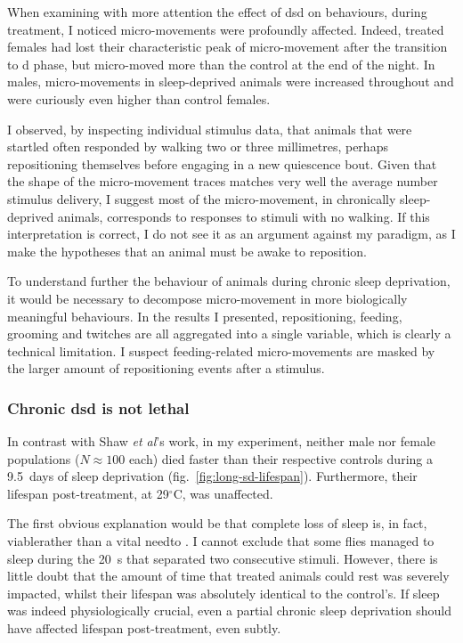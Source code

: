 When examining with more attention the effect of \gls{dsd} on behaviours, during treatment,  
I noticed micro-movements were profoundly affected.
Indeed, treated females had lost their characteristic peak of micro-movement after the transition to \gls{d} phase, but micro-moved more than the control at the end of the night.
In males, micro-movements in sleep-deprived animals were increased throughout and were curiously even higher than control females.

I observed, by inspecting individual stimulus data, that animals that were startled often responded by walking two or three millimetres, perhaps repositioning themselves before engaging in a new quiescence bout.
Given that the shape of the micro-movement traces matches very well the average number stimulus delivery, 
I suggest most of the micro-movement, in chronically sleep-deprived animals, corresponds to responses to stimuli with no walking.
If this interpretation is correct, I do not see it as an argument against my paradigm, as I make the hypotheses that an animal must be awake to reposition.

To understand further the behaviour of animals during chronic sleep deprivation, it would be necessary to decompose micro-movement in more biologically meaningful behaviours.
In the results I presented, repositioning, feeding, grooming and twitches are all aggregated into a single variable, which is clearly a technical limitation.
I suspect feeding-related micro-movements are masked by the larger amount of repositioning events after a stimulus.

\subsubsection{Chronic \gls{dsd} is not lethal}

In contrast with Shaw \emph{et al}'s work\cite{shaw_stress_2002},
in my experiment, neither male nor female populations ($N\approx100$ each) died faster than their respective controls during a 9.5~days of sleep deprivation  (fig.~\ref{fig:long-sd-lifespan}).
Furthermore, their lifespan post-treatment, at 29$^{\circ}$C, was unaffected.

The first obvious explanation would be that complete loss of sleep is, in fact, viable\emd{}rather than a vital need\emd{}to \dmel{}.
I cannot exclude that some flies managed to sleep during the 20~s that separated two consecutive stimuli.
However, there is little doubt that the amount of time that treated animals could rest was severely impacted, whilst their lifespan was absolutely identical to the control's.
If sleep was indeed physiologically crucial,
even a partial chronic sleep deprivation  should have affected lifespan post-treatment, even subtly.

